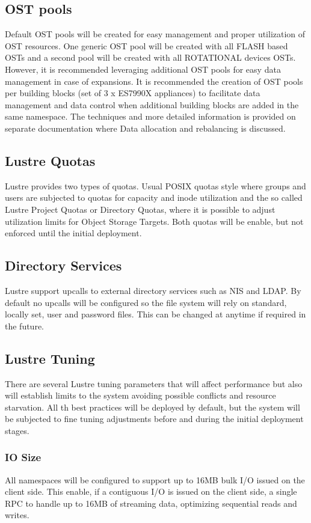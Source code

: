 \documentclass{article}
\begin{document}
\subsection{OST pools}
Default OST pools will be created for easy management and proper utilization of OST resources. One generic OST pool will be created with all FLASH based OSTs and a second pool will be created with all ROTATIONAL devices OSTs. However, it is recommended leveraging additional OST pools for easy data management in case of expansions. It is recommended the creation of OST pools per building blocks (set of 3 x ES7990X appliances) to facilitate data management and data control when additional building blocks are added in the same namespace. The techniques and more detailed information is provided on separate documentation where Data allocation and rebalancing is discussed. 

\subsection{Lustre Quotas}
Lustre provides two types of quotas. Usual POSIX quotas style where groups and users are subjected to quotas for capacity and inode utilization and the so called Lustre Project Quotas or Directory Quotas, where it is possible to adjust utilization limits for Object Storage Targets. Both quotas will be enable, but not enforced until the initial deployment. 

\subsection{Directory Services}
Lustre support upcalls to external directory services such as NIS and LDAP. By default no upcalls will be configured so the file system will rely on standard, locally set, user and password files. This can be changed at anytime if required in the future.

\subsection{Lustre Tuning}
There are several Lustre tuning parameters that will affect performance but also will establish limits to the system avoiding possible conflicts and resource starvation. All th best practices will be deployed by default, but the system will be subjected to fine tuning adjustments before and during the initial deployment stages. 

\subsubsection{IO Size}
All namespaces will be configured to support up to 16MB bulk I/O issued on the client side. This enable, if a contiguous I/O is issued on the client side, a single RPC to handle up to 16MB of streaming data, optimizing sequential reads and writes. 
\end{document}
